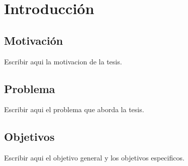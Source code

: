 \chapter{Introducción}

\section{Motivación}

Escribir aqui la motivacion de la tesis.

\section{Problema}

Escribir aqui el problema que aborda la tesis.

\section{Objetivos}

Escribir aqui el objetivo general y los objetivos especificos.
